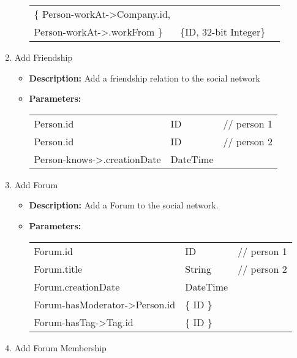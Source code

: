 \begin{enumerate}
\begin{itemize}
\begin{tabular}{lll}
                \{ Person-workAt->Company.id, \\
                Person-workAt->.workFrom \}  & \{ID, 32-bit Integer\} & \parbox[t]{20cm}{\par \strut} \\
            \end{tabular}		
    \end{itemize}
    \item Add Friendship
        \begin{itemize}
        \item \textbf{Description:} Add a friendship relation to the social network
        \item \textbf{Parameters:} \\
			\begin{tabular}{lll}
				Person.id 	 			& ID & \parbox[t]{20cm}{// person 1\strut} \\
				Person.id 	 			& ID & \parbox[t]{20cm}{// person 2\strut} \\
				Person-knows->.creationDate & DateTime & \parbox[t]{20cm}{\par \strut} \\
            \end{tabular}		
    \end{itemize}
    \item Add Forum
        \begin{itemize}
            \item \textbf{Description:} Add a Forum to the social network.
        \item \textbf{Parameters:} \\
			\begin{tabular}{lll}
				Forum.id 	 			& ID & \parbox[t]{20cm}{// person 1\strut} \\
				Forum.title 	 			& String & \parbox[t]{20cm}{// person 2\strut} \\
				Forum.creationDate & DateTime & \parbox[t]{20cm}{\par \strut} \\
                Forum-hasModerator->Person.id 	& \{ ID \} & \parbox[t]{20cm}{\par \strut} \\
                Forum-hasTag->Tag.id 	& \{ ID \} & \parbox[t]{20cm}{\par \strut} \\
            \end{tabular}		
    \end{itemize}
    \item Add Forum Membership

\end{enumerate}
